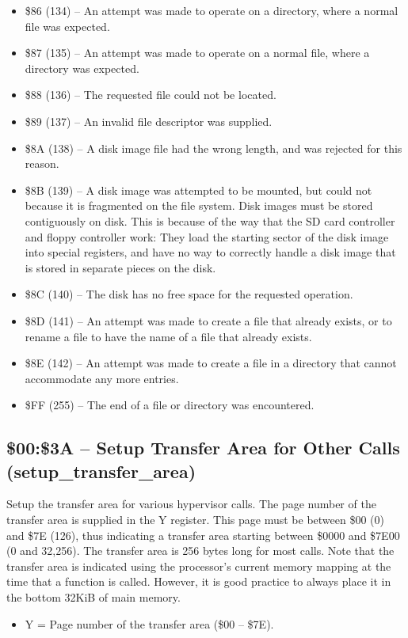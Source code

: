 \begin{itemize}
\item \$86 (134) -- An attempt was made to operate on a directory, where a normal file was expected.
\item \$87 (135) -- An attempt was made to operate on a normal file, where a directory was expected.
\item \$88 (136) -- The requested file could not be located.
\item \$89 (137) -- An invalid file descriptor was supplied.
\item \$8A (138) -- A disk image file had the wrong length, and was rejected for this reason.
\item \$8B (139) -- A disk image was attempted to be mounted, but could not because it is fragmented on the file system.  Disk images must be stored contiguously on disk. This is because of the way that the SD card controller and floppy controller work: They load the starting sector of the disk image into special registers, and have no way to correctly handle a disk image that is stored in separate pieces on the disk. 
\item \$8C (140) -- The disk has no free space for the requested operation.
\item \$8D (141) -- An attempt was made to create a file that already exists, or to rename a file to have the name of a file that already exists.
\item \$8E (142) -- An attempt was made to create a file in a directory that cannot accommodate any more entries.
\item \$FF (255) -- The end of a file or directory was encountered.
\end{itemize}

\subsection{\$00:\$3A -- Setup Transfer Area for Other Calls (setup\_transfer\_area)}

Setup the transfer area for various hypervisor calls. The page number of the transfer area is supplied in the Y register.
This page must be between \$00 (0) and \$7E (126), thus indicating a transfer area starting between \$0000 and \$7E00 (0 and 32,256).
The transfer area is
256 bytes long for most calls.  Note that the transfer area is indicated using the processor's current memory mapping at
the time that a function is called.  However, it is good practice to always place it in the bottom 32KiB of main memory.

\begin{itemize}
  \item Y = Page number of the transfer area (\$00 -- \$7E).
\end{itemize}

